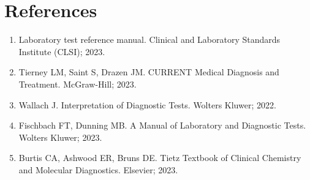 \section*{References}
\begin{enumerate}
  \item Laboratory test reference manual. Clinical and Laboratory Standards Institute (CLSI); 2023.
  \item Tierney LM, Saint S, Drazen JM. CURRENT Medical Diagnosis and Treatment. McGraw-Hill; 2023.
  \item Wallach J. Interpretation of Diagnostic Tests. Wolters Kluwer; 2022.
  \item Fischbach FT, Dunning MB. A Manual of Laboratory and Diagnostic Tests. Wolters Kluwer; 2023.
  \item Burtis CA, Ashwood ER, Bruns DE. Tietz Textbook of Clinical Chemistry and Molecular Diagnostics. Elsevier; 2023.
\end{enumerate}

\clearpage

